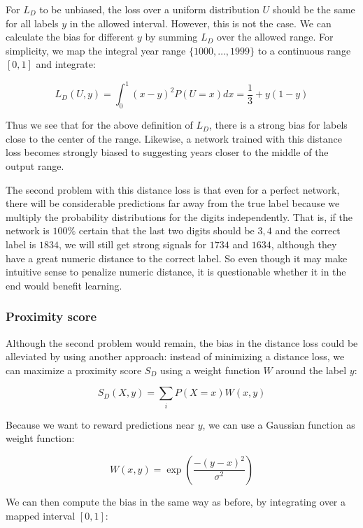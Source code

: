 For $L_D$ to be unbiased, the loss over a uniform distribution $U$ should be the same for all labels $y$ in the allowed interval. However, this is not the case. We can calculate the bias for different $y$ by summing $L_D$ over the allowed range. For simplicity, we map the integral year range $\{ 1000, \ldots, 1999 \}$ to a continuous range $[0,1]$ and integrate:

\[
L_D(U, y) = \int_0^1 (x-y)^2 P(U=x) dx = \frac{1}{3} + y(1-y)
\]

Thus we see that for the above definition of $L_D$, there is a strong bias for labels close to the center of the range. Likewise, a network trained with this distance loss becomes strongly biased to suggesting years closer to the middle of the output range.


The second problem with this distance loss is that even for a perfect network, there will be considerable predictions far away from the true label because we multiply the probability distributions for the digits independently. That is, if the network is $100\%$ certain that the last two digits should be $3, 4$ and the correct label is $1834$, we will still get strong signals for $1734$ and $1634$, although they have a great numeric distance to the correct label.
So even though it may make intuitive sense to penalize numeric distance, it is questionable whether it in the end would benefit learning.

\subsubsection{Proximity score}

Although the second problem would remain, the bias in the distance loss could be alleviated by using another approach:
instead of minimizing a distance loss, we can maximize a proximity score $S_D$ using a weight function $W$ around the label $y$:

\[
S_D(X, y) = \sum_i P(X=x) W(x, y)
\]

Because we want to reward predictions near $y$, we can use a Gaussian function as weight function:

\[
W(x, y) = \exp \left( \frac{-(y-x)^2}{\sigma^2} \right)
\]

We can then compute the bias in the same way as before, by integrating over a mapped interval $[0,1]$:

